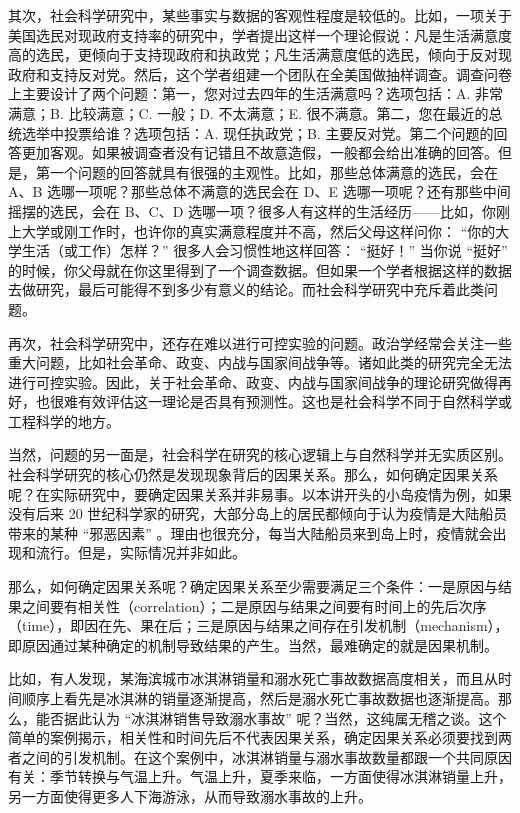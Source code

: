 其次，社会科学研究中，某些事实与数据的客观性程度是较低的。比如，一项关于美国选民对现政府支持率的研究中，学者提出这样一个理论假说：凡是生活满意度高的选民，更倾向于支持现政府和执政党；凡生活满意度低的选民，倾向于反对现政府和支持反对党。然后，这个学者组建一个团队在全美国做抽样调查。调查问卷上主要设计了两个问题：第一，您对过去四年的生活满意吗？选项包括：A. 非常满意；B. 比较满意；C. 一般；D. 不太满意；E. 很不满意。第二，您在最近的总统选举中投票给谁？选项包括：A. 现任执政党；B. 主要反对党。第二个问题的回答更加客观。如果被调查者没有记错且不故意造假，一般都会给出准确的回答。但是，第一个问题的回答就具有很强的主观性。比如，那些总体满意的选民，会在 A、B 选哪一项呢？那些总体不满意的选民会在 D、E 选哪一项呢？还有那些中间摇摆的选民，会在 B、C、D 选哪一项？很多人有这样的生活经历——比如，你刚上大学或刚工作时，也许你的真实满意程度并不高，然后父母这样问你： “你的大学生活（或工作）怎样？” 很多人会习惯性地这样回答： “挺好！” 当你说 “挺好” 的时候，你父母就在你这里得到了一个调查数据。但如果一个学者根据这样的数据去做研究，最后可能得不到多少有意义的结论。而社会科学研究中充斥着此类问题。

再次，社会科学研究中，还存在难以进行可控实验的问题。政治学经常会关注一些重大问题，比如社会革命、政变、内战与国家间战争等。诸如此类的研究完全无法进行可控实验。因此，关于社会革命、政变、内战与国家间战争的理论研究做得再好，也很难有效评估这一理论是否具有预测性。这也是社会科学不同于自然科学或工程科学的地方。

当然，问题的另一面是，社会科学在研究的核心逻辑上与自然科学并无实质区别。社会科学研究的核心仍然是发现现象背后的因果关系。那么，如何确定因果关系呢？在实际研究中，要确定因果关系并非易事。以本讲开头的小岛疫情为例，如果没有后来 20 世纪科学家的研究，大部分岛上的居民都倾向于认为疫情是大陆船员带来的某种 “邪恶因素” 。理由也很充分，每当大陆船员来到岛上时，疫情就会出现和流行。但是，实际情况并非如此。

那么，如何确定因果关系呢？确定因果关系至少需要满足三个条件：一是原因与结果之间要有相关性（correlation）；二是原因与结果之间要有时间上的先后次序（time），即因在先、果在后；三是原因与结果之间存在引发机制（mechanism），即原因通过某种确定的机制导致结果的产生。当然，最难确定的就是因果机制。

比如，有人发现，某海滨城市冰淇淋销量和溺水死亡事故数据高度相关，而且从时间顺序上看先是冰淇淋的销量逐渐提高，然后是溺水死亡事故数据也逐渐提高。那么，能否据此认为 “冰淇淋销售导致溺水事故” 呢？当然，这纯属无稽之谈。这个简单的案例揭示，相关性和时间先后不代表因果关系，确定因果关系必须要找到两者之间的引发机制。在这个案例中，冰淇淋销量与溺水事故数量都跟一个共同原因有关：季节转换与气温上升。气温上升，夏季来临，一方面使得冰淇淋销量上升，另一方面使得更多人下海游泳，从而导致溺水事故的上升。

